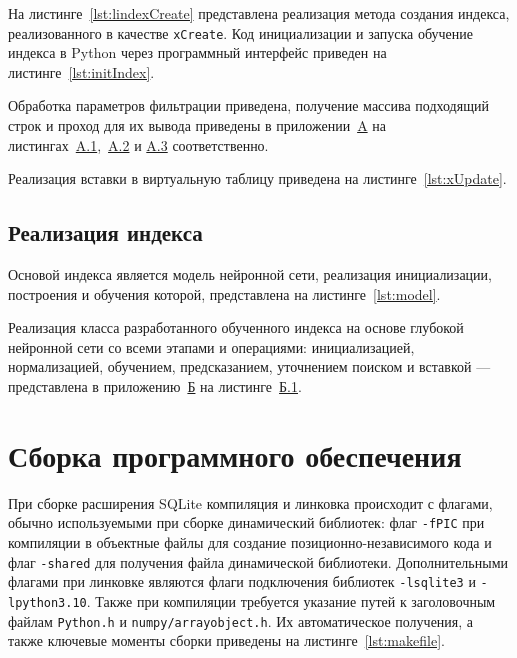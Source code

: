 На листинге~\ref{lst:lindexCreate} представлена реализация метода создания
индекса, реализованного в качестве \texttt{xCreate}. Код инициализации и запуска
обучение индекса в Python через программный интерфейс приведен на
листинге~\ref{lst:initIndex}.



Обработка параметров фильтрации приведена, получение массива подходящий строк и
проход для их вывода приведены в приложении~\hyperref[add1]{A} на
листингах~\hyperref[lst:xBestIndex]{A.1},~\hyperref[lst:xFilter]{A.2} и
\hyperref[lst:xSearch]{A.3} соответственно.

Реализация вставки в виртуальную таблицу приведена на
листинге~\ref{lst:xUpdate}.


\subsection{Реализация индекса}

Основой индекса является модель нейронной сети, реализация инициализации,
построения и обучения которой, представлена на листинге~\ref{lst:model}.


Реализация класса разработанного обученного индекса на основе глубокой нейронной
сети со всеми этапами и операциями: инициализацией, нормализацией, обучением,
предсказанием, уточнением поиском и вставкой --- представлена в
приложению~\hyperref[add2]{Б} на листинге~\hyperref[lst:lindex]{Б.1}.

\section{Сборка программного обеспечения}

При сборке расширения SQLite компиляция и линковка происходит с флагами,
обычно используемыми при сборке динамический библиотек: флаг \texttt{-fPIC} при
компиляции в объектные файлы для создание позиционно-независимого кода и флаг
\texttt{-shared} для получения файла динамической библиотеки. Дополнительными
флагами при линковке являются флаги подключения библиотек \texttt{-lsqlite3} и
\texttt{-lpython3.10}. Также при компиляции требуется указание путей к
заголовочным файлам \texttt{Python.h} и \texttt{numpy/arrayobject.h}. Их
автоматическое получения, а также ключевые моменты сборки приведены на
листинге~\ref{lst:makefile}.

